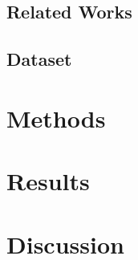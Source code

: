 \documentclass[12pt]{article}
\begin{document}
\subsection{Related Works}

\subsection{Dataset}

\section{Methods}

\section{Results}

\section{Discussion}
\end{document}
